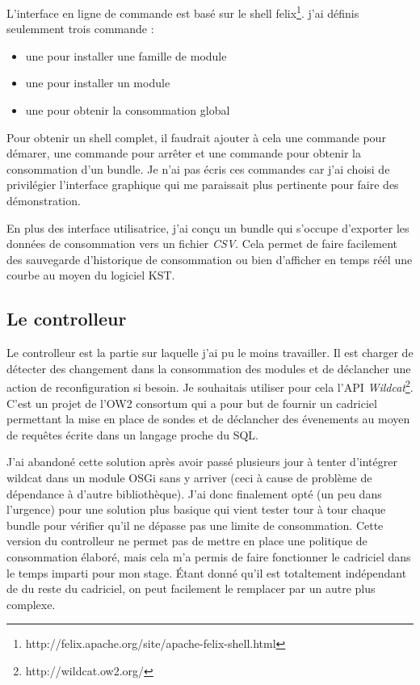 \documentclass[a4paper, 11pt]{report}
\begin{document}
L'interface en ligne de commande est basé sur le shell felix\footnote{http://felix.apache.org/site/apache-felix-shell.html}. j'ai définis seulemment trois commande :
\begin{itemize}
  \item une pour installer une famille de module
  \item une pour installer un module
  \item une pour obtenir la consommation global
\end{itemize}
Pour obtenir un shell complet, il faudrait ajouter à cela une commande pour démarer, une commande pour arrêter et une commande pour obtenir la consommation d'un bundle. Je n'ai pas écris ces commandes car j'ai choisi de privilégier l'interface graphique qui me paraissait plus pertinente pour faire des démonstration.

En plus des interface utilisatrice, j'ai conçu un bundle qui s'occupe d'exporter les données de consommation vers un fichier \textit{CSV}. Cela permet de faire facilement des sauvegarde d'historique de consommation ou bien d'afficher en temps réél une courbe au moyen du logiciel KST.
 
		\subsection{Le controlleur}
Le controlleur est la partie sur laquelle j'ai pu le moins travailler. Il est charger de détecter des changement dans la consommation des modules et de déclancher une action de reconfiguration si besoin. Je souhaitais utiliser pour cela l'API \textit{Wildcat}\footnote{http://wildcat.ow2.org/}. C'est un projet de l'OW2 consortum qui a pour but de fournir un cadriciel permettant la mise en place de sondes et de déclancher des évenements au moyen de requêtes écrite dans un langage proche du SQL.

J'ai abandoné cette solution après avoir passé plusieurs jour à tenter d'intégrer wildcat dans un module OSGi sans y arriver (ceci  à cause de problème de dépendance à d'autre bibliothèque). J'ai donc finalement opté (un peu dans l'urgence) pour une solution plus basique qui vient tester tour à tour chaque bundle pour vérifier qu'il ne dépasse pas une limite de consommation. Cette version du controlleur ne permet pas de mettre en place une politique de consommation élaboré, mais cela m'a permis de faire fonctionner le cadriciel dans le temps imparti pour mon stage. Étant donné qu'il est totaltement indépendant de du reste du cadriciel, on peut facilement le remplacer par un autre plus complexe.
   
\end{document}
